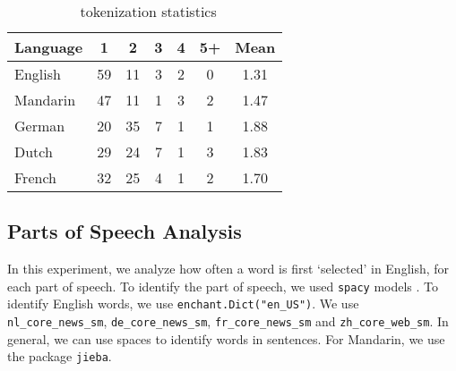 \begin{table*}[h]
\caption{\aya \ tokenization statistics}
\label{aya-token-mean}
\vskip 0.15in
\begin{center}
\begin{small}
\begin{sc}
\begin{tabular}{l cccccc}
\toprule
Language & 1 & 2 & 3 & 4 & 5+ & Mean \\ \midrule
English & 59 & 11 & 3 & 2 & 0 & 1.31 \\
Mandarin & 47 & 11 & 1 & 3 & 2 & 1.47 \\
German & 20 & 35 & 7 & 1 & 1 & 1.88 \\
Dutch & 29 & 24 & 7 & 1 & 3 & 1.83 \\
French & 32 & 25 & 4 & 1 & 2 & 1.70 \\
\bottomrule
\end{tabular}
\end{sc}
\end{small}
\end{center}
\vskip -0.1in
\end{table*}

\FloatBarrier
\newpage 

\subsection{Parts of Speech Analysis}

In this experiment, we analyze how often a word is first `selected' in English, for each part of speech. To identify the part of speech, we used \texttt{spacy} models \citep{spacy2}.
To identify English words, we use \texttt{enchant.Dict("en\_US")}.
We use \texttt{nl\_core\_news\_sm}, \texttt{de\_core\_news\_sm}, \texttt{fr\_core\_news\_sm} and \texttt{zh\_core\_web\_sm}.
In general, we can use spaces to identify words in sentences. For Mandarin, we use the package \texttt{jieba}.

